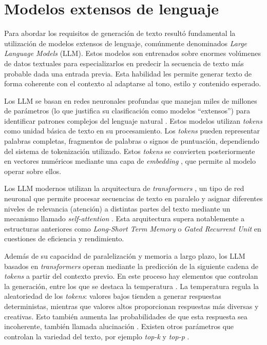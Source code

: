 \section{Modelos extensos de lenguaje}
Para abordar los requisitos de generación de texto resultó fundamental la utilización 
de modelos extensos de lenguaje, comúnmente denominados \textit{Large Language Models} (LLM).
Estos modelos son entrenados sobre enormes volúmenes de datos textuales para especializarlos
en predecir la secuencia de texto más probable dada una entrada previa.
Esta habilidad les permite generar texto de forma coherente con el contexto
al adaptarse al tono, estilo y contenido esperado.

Los LLM se basan en redes neuronales profundas que manejan miles de millones de parámetros
(lo que justifica su clasificación como modelos ``extensos'') para identificar patrones complejos del lenguaje natural \cite{att_is_all_you_need}. 
Estos modelos utilizan \textit{tokens} como unidad básica de texto en su procesamiento.
Los \textit{tokens} pueden representar palabras completas, fragmentos de palabras o signos de puntuación,
dependiendo del sistema de tokenización utilizado.
Estos \textit{tokens} se convierten posteriormente en vectores numéricos
mediante una capa de \textit{embedding} \cite{mikolov2013efficient}, que permite al modelo operar sobre ellos.

Los LLM modernos utilizan la arquitectura de \textit{transformers} \cite{att_is_all_you_need},
un tipo de red neuronal que permite procesar secuencias de texto en paralelo y asignar diferentes niveles de relevancia
(atención) a distintas partes del texto mediante un mecanismo llamado \textit{self-attention} \cite{att_is_all_you_need}.
Esta arquitectura supera notablemente a estructuras anteriores como \textit{Long-Short Term Memory} \cite{hochreiter1997long}
o \textit{Gated Recurrent Unit} \cite{cho2014learning} en cuestiones de eficiencia y rendimiento.

Además de su capacidad de paralelización y memoria a largo plazo, los LLM basados en \textit{transformers} operan 
mediante la predicción de la siguiente cadena de \textit{tokens} a partir del contexto previo.
En este proceso hay elementos que controlan la generación, entre los que se destaca la temperatura \cite{radford2019language}.
La temperatura regula la aleatoriedad de los \textit{tokens}: valores bajos tienden a generar respuestas deterministas,
mientras que valores altos proporcionan respuestas más diversas y creativas.
Esto también aumenta las probabilidades de que esta respuesta sea incoherente,
también llamada alucinación \cite{Ji2023SurveyHallucination}.
Existen otros parámetros que controlan la variedad del texto, por ejemplo \textit{top-k} y \textit{top-p} \cite{holtzman2019curious}.

